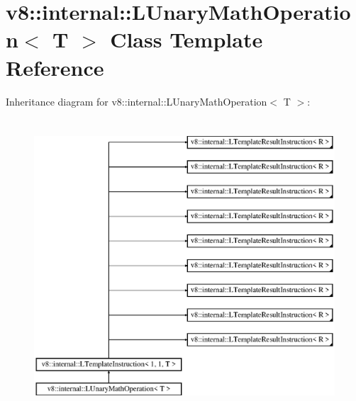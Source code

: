 \hypertarget{classv8_1_1internal_1_1_l_unary_math_operation}{}\section{v8\+:\+:internal\+:\+:L\+Unary\+Math\+Operation$<$ T $>$ Class Template Reference}
\label{classv8_1_1internal_1_1_l_unary_math_operation}
Inheritance diagram for v8\+:\+:internal\+:\+:L\+Unary\+Math\+Operation$<$ T $>$\+:\begin{figure}[H]
\begin{center}
\leavevmode
\includegraphics[height=11.000000cm]{classv8_1_1internal_1_1_l_unary_math_operation}
\end{center}
\end{figure}
